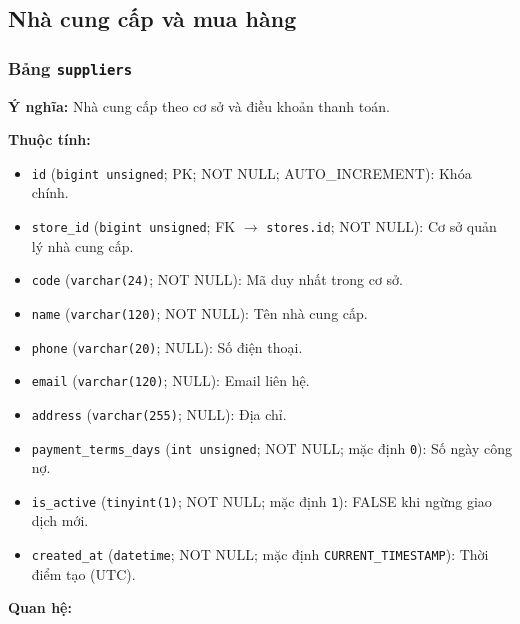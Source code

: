 \subsection{Nhà cung cấp và mua hàng}

\subsubsection{Bảng \texttt{suppliers}}

\textbf{Ý nghĩa:} Nhà cung cấp theo cơ sở và điều khoản thanh toán.\par

\textbf{Thuộc tính:}

\begin{itemize}

\item \texttt{id} (\texttt{bigint unsigned}; PK; NOT NULL; AUTO_INCREMENT): Khóa chính.

\item \texttt{store\_id} (\texttt{bigint unsigned}; FK $\rightarrow$ \texttt{stores.id}; NOT NULL): Cơ sở quản lý nhà cung cấp.

\item \texttt{code} (\texttt{varchar(24)}; NOT NULL): Mã duy nhất trong cơ sở.

\item \texttt{name} (\texttt{varchar(120)}; NOT NULL): Tên nhà cung cấp.

\item \texttt{phone} (\texttt{varchar(20)}; NULL): Số điện thoại.

\item \texttt{email} (\texttt{varchar(120)}; NULL): Email liên hệ.

\item \texttt{address} (\texttt{varchar(255)}; NULL): Địa chỉ.

\item \texttt{payment\_terms\_days} (\texttt{int unsigned}; NOT NULL; mặc định \texttt{0}): Số ngày công nợ.

\item \texttt{is\_active} (\texttt{tinyint(1)}; NOT NULL; mặc định \texttt{1}): FALSE khi ngừng giao dịch mới.

\item \texttt{created\_at} (\texttt{datetime}; NOT NULL; mặc định \texttt{CURRENT\_TIMESTAMP}): Thời điểm tạo (UTC).

\end{itemize}

\textbf{Quan hệ:}


